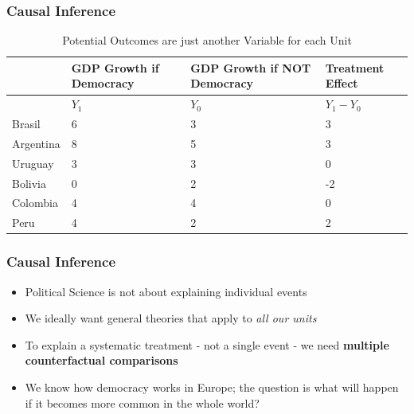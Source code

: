 \documentclass[xcolor=x11names,compress]{beamer}\usepackage[]{graphicx}\usepackage[]{color}
\renewcommand{\(}{\begin{columns}}
\renewcommand{\)}{\end{columns}}
\newcommand{\<}[1]{\begin{column}{#1}}
\renewcommand{\>}{\end{column}}
\begin{document}
\begin{frame}
\frametitle{Causal Inference}
\footnotesize
\begin{table}[htbp]
  \centering
  \caption{Potential Outcomes are just another Variable for each Unit}
    \begin{tabular}{|p{2.4cm}|p{2.4cm}|p{2.4cm}|p{2.4cm}|}
    \hline
          & \multicolumn{1}{p{2.4cm}|}{GDP Growth if Democracy} & \multicolumn{1}{p{2.4cm}|}{GDP Growth if  NOT Democracy} &  Treatment Effect\bigstrut\\
    \hline
          & \multicolumn{1}{l|}{$Y_1$} & \multicolumn{1}{l|}{$Y_0$} & \multicolumn{1}{l|}{$Y_1-Y_0$} \bigstrut\\
    \hline
    Brasil & 6     & 3     & 3 \bigstrut\\
    \hline
    Argentina & 8    & 5     & 3 \bigstrut\\
    \hline
    Uruguay & 3 & 3 & 0  \bigstrut\\
    \hline
    Bolivia & 0     & 2     & -2 \bigstrut\\
    \hline
    Colombia & 4    & 4    & 0 \bigstrut\\
    \hline
    Peru & 4     & 2     & 2 \bigstrut\\
    \hline
    \end{tabular}%
  \label{tab:addlabel}%
\end{table}%
\normalsize
\end{frame}

\begin{frame}
\frametitle{Causal Inference}
\begin{itemize}
\item Political Science is not about explaining individual events
\pause
\item We ideally want general theories that apply to \textit{all our units}
\pause
\item To explain a systematic treatment - not a single event - we need \textbf{multiple counterfactual comparisons}
\pause
\item We know how democracy works in Europe; the question is what will happen if it becomes more common in the whole world?
\pause
{}
\end{itemize}
\end{frame}
\end{document}

